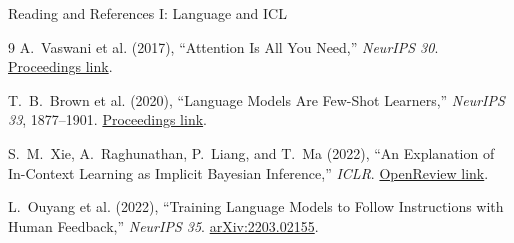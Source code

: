 \documentclass[aspectratio=169,11pt]{beamer}
\begin{document}
\begin{frame}{Reading and References I: Language and ICL}
\footnotesize
\begin{thebibliography}{9}
A.~Vaswani et al. (2017),
``Attention Is All You Need,'' \emph{NeurIPS 30}.
\href{https://proceedings.neurips.cc/paper_files/paper/2017/hash/3f5ee243547dee91fbd053c1c4a845aa-Abstract.html}{Proceedings link}.

T.~B.~Brown et al. (2020),
``Language Models Are Few-Shot Learners,'' \emph{NeurIPS 33}, 1877--1901.
\href{https://proceedings.neurips.cc/paper/2020/hash/1457c0d6bfcb4967418bfb8ac142f64a-Abstract.html}{Proceedings link}.

S.~M.~Xie, A.~Raghunathan, P.~Liang, and T.~Ma (2022),
``An Explanation of In-Context Learning as Implicit Bayesian Inference,'' \emph{ICLR}.
\href{https://openreview.net/forum?id=RdJVFCHjUMI}{OpenReview link}.

L.~Ouyang et al. (2022),
``Training Language Models to Follow Instructions with Human Feedback,'' \emph{NeurIPS 35}.
\href{https://arxiv.org/abs/2203.02155}{arXiv:2203.02155}.


\end{thebibliography}
 \end{frame}
\end{document}
